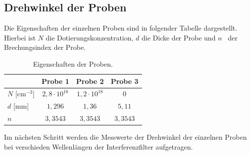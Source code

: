 \subsection{Drehwinkel der Proben}

Die Eigenschaften der einzelnen Proben sind in folgender Tabelle dargestellt. Hierbei ist $N$ die Dotierungskonzentration, $d$ die Dicke der Probe und $n$~\cite{Brechungsindex} der Brechungsindex der Probe.
\begin{table}[H]
    \centering
    \caption{Eigenschaften der Proben.}

    \begin{tabular}{lccc}
        \toprule
        & \textbf{Probe 1} & \textbf{Probe 2} & \textbf{Probe 3} \\
        \midrule
        $N$ [cm$^{-3}$] & $2,8 \cdot 10^{18}$ & $1,2 \cdot 10^{18}$ & $0$ \\
        $d$ [mm] & $1,296$ & $1,36$ & $5,11$ \\
        $n$ & $3,3543$ & $3,3543$ & $3,3543$ \\
        \bottomrule
    \end{tabular}
\end{table}

Im nächsten Schritt werden die Messwerte der Drehwinkel der einzelnen Proben bei verschieden Wellenlängen der Interferenzfilter aufgetragen.

